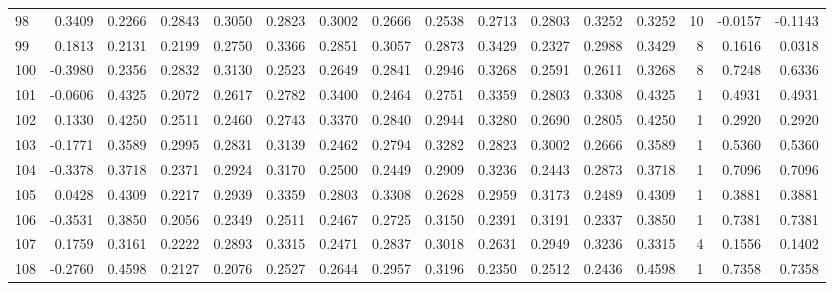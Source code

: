 \begin{tabular}{lrrrrrrrrrrrrrrr}
98  &      0.3409 &  0.2266 &  0.2843 &  0.3050 &  0.2823 &  0.3002 &  0.2666 &  0.2538 &  0.2713 &  0.2803 &   0.3252 &     0.3252 &     10 &                   -0.0157 &                    -0.1143 \\
99  &      0.1813 &  0.2131 &  0.2199 &  0.2750 &  0.3366 &  0.2851 &  0.3057 &  0.2873 &  0.3429 &  0.2327 &   0.2988 &     0.3429 &      8 &                    0.1616 &                     0.0318 \\
100 &     -0.3980 &  0.2356 &  0.2832 &  0.3130 &  0.2523 &  0.2649 &  0.2841 &  0.2946 &  0.3268 &  0.2591 &   0.2611 &     0.3268 &      8 &                    0.7248 &                     0.6336 \\
101 &     -0.0606 &  0.4325 &  0.2072 &  0.2617 &  0.2782 &  0.3400 &  0.2464 &  0.2751 &  0.3359 &  0.2803 &   0.3308 &     0.4325 &      1 &                    0.4931 &                     0.4931 \\
102 &      0.1330 &  0.4250 &  0.2511 &  0.2460 &  0.2743 &  0.3370 &  0.2840 &  0.2944 &  0.3280 &  0.2690 &   0.2805 &     0.4250 &      1 &                    0.2920 &                     0.2920 \\
103 &     -0.1771 &  0.3589 &  0.2995 &  0.2831 &  0.3139 &  0.2462 &  0.2794 &  0.3282 &  0.2823 &  0.3002 &   0.2666 &     0.3589 &      1 &                    0.5360 &                     0.5360 \\
104 &     -0.3378 &  0.3718 &  0.2371 &  0.2924 &  0.3170 &  0.2500 &  0.2449 &  0.2909 &  0.3236 &  0.2443 &   0.2873 &     0.3718 &      1 &                    0.7096 &                     0.7096 \\
105 &      0.0428 &  0.4309 &  0.2217 &  0.2939 &  0.3359 &  0.2803 &  0.3308 &  0.2628 &  0.2959 &  0.3173 &   0.2489 &     0.4309 &      1 &                    0.3881 &                     0.3881 \\
106 &     -0.3531 &  0.3850 &  0.2056 &  0.2349 &  0.2511 &  0.2467 &  0.2725 &  0.3150 &  0.2391 &  0.3191 &   0.2337 &     0.3850 &      1 &                    0.7381 &                     0.7381 \\
107 &      0.1759 &  0.3161 &  0.2222 &  0.2893 &  0.3315 &  0.2471 &  0.2837 &  0.3018 &  0.2631 &  0.2949 &   0.3236 &     0.3315 &      4 &                    0.1556 &                     0.1402 \\
108 &     -0.2760 &  0.4598 &  0.2127 &  0.2076 &  0.2527 &  0.2644 &  0.2957 &  0.3196 &  0.2350 &  0.2512 &   0.2436 &     0.4598 &      1 &                    0.7358 &                     0.7358 \\

\end{tabular}
